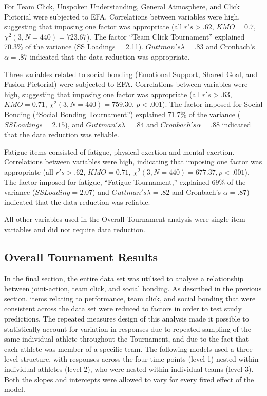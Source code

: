 For Team Click, Unspoken Understanding, General Atmosphere, and Click Pictorial were subjected to EFA.  Correlations between variables were high, suggesting that imposing one factor was appropriate (all $r's > .62$, $KMO = 0.7$, $\chi^2(3, N = 440) = 723.67$).  The factor ``Team Click Tournament'' explained 70.3\% of the variance (SS Loadings = 2.11).  $Guttman's \lambda =.83$ and Cronbach's $\alpha = .87$ indicated that the data reduction was appropriate.

Three variables related to social bonding (Emotional Support, Shared Goal, and Fusion Pictorial) were subjected to EFA. Correlations between variables were high, suggesting that imposing one factor was appropriate (all $r's > .63$, $KMO = 0.71$, $\chi^2(3, N = 440) =  759.30$, $p < .001$).  The factor imposed for Social Bonding (``Social Bonding Tournament'') explained 71.7\% of the variance ($SS Loadings =  2.15$), and $Guttman's \lambda =.84$ and $Cronbach's \alpha= .88$ indicated that the data reduction was reliable.

Fatigue items consisted of fatigue, physical exertion and mental exertion. Correlations between variables were high, indicating that imposing one factor was appropriate (all $r's > .62$, $KMO = 0.71$, $\chi^2(3, N = 440) =  677.37, p < .001$).  The factor imposed for fatigue, ``Fatigue Tournament,'' explained 69\% of the variance ($SS Loading = 2.07$) and $Guttman's \lambda =.82$ and Cronbach's $\alpha = .87$) indicated that the data reduction was reliable.

All other variables used in the Overall Tournament analysis were single item variables and did not require data reduction.





\subsection{Overall Tournament Results}
In the final section, the entire data set was utilised to analyse a relationship between joint-action, team click, and social bonding. As described in the previous section, items relating to performance, team click, and social bonding that were consistent across the data set were reduced to factors in order to test study predictions. The repeated measures design of this analysis made it possible to statistically account for variation in responses due to repeated sampling of the same individual athlete throughout the Tournament, and due to the fact that each athlete was member of a specific team. The following models used a three-level structure, with responses across the four time points (level 1) nested within individual athletes (level 2), who were nested within individual teams (level 3). Both the slopes and intercepts were allowed to vary for every fixed effect of the model.

